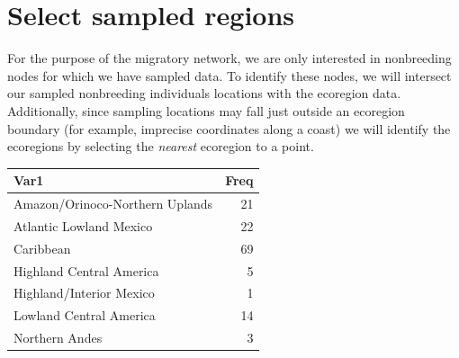 \documentclass[
]{book}
\newenvironment{Shaded}{\begin{snugshade}}{\end{snugshade}}
\newcommand{\AttributeTok}[1]{\textcolor[rgb]{0.13,0.29,0.53}{#1}}
\newcommand{\CommentTok}[1]{\textcolor[rgb]{0.56,0.35,0.01}{\textit{#1}}}
\newcommand{\ConstantTok}[1]{\textcolor[rgb]{0.56,0.35,0.01}{#1}}
\newcommand{\FunctionTok}[1]{\textcolor[rgb]{0.13,0.29,0.53}{\textbf{#1}}}
\newcommand{\NormalTok}[1]{#1}
\newcommand{\OtherTok}[1]{\textcolor[rgb]{0.56,0.35,0.01}{#1}}
\newcommand{\SpecialCharTok}[1]{\textcolor[rgb]{0.81,0.36,0.00}{\textbf{#1}}}
\newcommand{\StringTok}[1]{\textcolor[rgb]{0.31,0.60,0.02}{#1}}
\begin{document}
\hypertarget{select-sampled-regions}{%
\section{Select sampled regions}\label{select-sampled-regions}}

For the purpose of the migratory network, we are only interested in nonbreeding nodes for which we have sampled data. To identify these nodes, we will intersect our sampled nonbreeding individuals locations with the ecoregion data. Additionally, since sampling locations may fall just outside an ecoregion boundary (for example, imprecise coordinates along a coast) we will identify the ecoregions by selecting the \emph{nearest} ecoregion to a point.

\begin{Shaded}
\end{Shaded}

\begin{Shaded}
\end{Shaded}

\begin{tabular}{l|r}
\hline
Var1 & Freq\\
\hline
Amazon/Orinoco-Northern Uplands & 21\\
\hline
Atlantic Lowland Mexico & 22\\
\hline
Caribbean & 69\\
\hline
Highland Central America & 5\\
\hline
Highland/Interior Mexico & 1\\
\hline
Lowland Central America & 14\\
\hline
Northern Andes & 3\\
\hline
\end{tabular}
\end{document}
